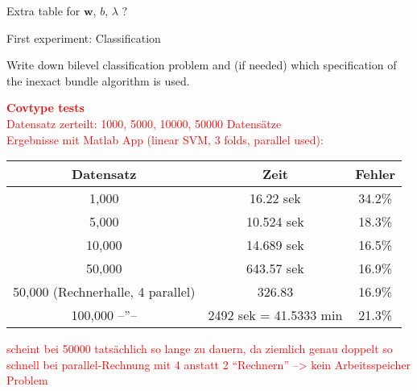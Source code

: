 
Extra table for \(\bm{w}\), \(b\), \(\lambda\) ?

First experiment: Classification

Write down bilevel classification problem and (if needed) which specification of the inexact bundle algorithm is used.















\textcolor{red}{\textbf{Covtype tests}\\
Datensatz zerteilt: 1000, 5000, 10000, 50000 Datens\"atze\\
Ergebnisse mit Matlab App (linear SVM, 3 folds, parallel used):\\
\begin{tabular}{c|c|c}
Datensatz & Zeit & Fehler \\
\hline
1,000 & 16.22 sek & 34.2\% \\
5,000 & 10.524 sek & 18.3\% \\
10,000 & 14.689 sek & 16.5\% \\
50,000 &  643.57 sek & 16.9\% \\
50,000 (Rechnerhalle, 4 parallel) & 326.83 & 16.9\% \\
100,000 --''-- & 2492 sek = 41.5333 min & 21.3\%
\end{tabular}}

\textcolor{red}{scheint bei 50000 tats\"achlich so lange zu dauern, da ziemlich genau doppelt so schnell bei parallel-Rechnung mit 4 anstatt 2 ``Rechnern'' --> kein Arbeitsspeicher Problem}

